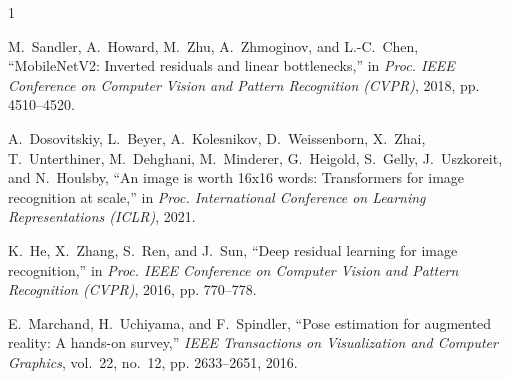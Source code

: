 \documentclass[conference]{IEEEtran}
\begin{document}
\begin{thebibliography}{1}

M.~Sandler, A.~Howard, M.~Zhu, A.~Zhmoginov, and L.-C.~Chen,
``MobileNetV2: Inverted residuals and linear bottlenecks,''
in \textit{Proc. IEEE Conference on Computer Vision and Pattern Recognition
(CVPR)}, 2018, pp. 4510--4520.

A.~Dosovitskiy, L.~Beyer, A.~Kolesnikov, D.~Weissenborn, X.~Zhai,
T.~Unterthiner, M.~Dehghani, M.~Minderer, G.~Heigold, S.~Gelly,
J.~Uszkoreit, and N.~Houlsby,
``An image is worth 16x16 words: Transformers for image recognition at scale,''
in \textit{Proc. International Conference on Learning Representations (ICLR)},
2021.

K.~He, X.~Zhang, S.~Ren, and J.~Sun,
``Deep residual learning for image recognition,''
in \textit{Proc. IEEE Conference on Computer Vision and Pattern Recognition
(CVPR)}, 2016, pp. 770--778.

E.~Marchand, H.~Uchiyama, and F.~Spindler,
``Pose estimation for augmented reality: A hands-on survey,''
\textit{IEEE Transactions on Visualization and Computer Graphics},
vol.~22, no.~12, pp. 2633--2651, 2016.

\end{thebibliography}
\end{document}
